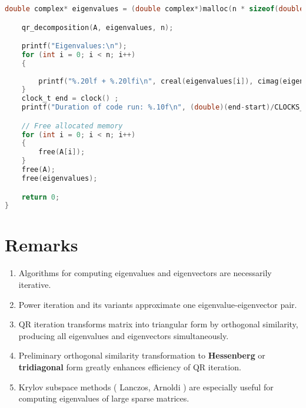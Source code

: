 \documentclass[report,12pt,onecolumn]{IEEEtran}
\theoremstyle{remark}
\begin{document}
\begin{itemize}
\begin{itemize}
\begin{lstlisting}[language = C]
    double complex* eigenvalues = (double complex*)malloc(n * sizeof(double complex));

    qr_decomposition(A, eigenvalues, n);

    printf("Eigenvalues:\n");
    for (int i = 0; i < n; i++) 
    {
        
        printf("%.20lf + %.20lfi\n", creal(eigenvalues[i]), cimag(eigenvalues[i]));
    }
    clock_t end = clock() ;
    printf("Duration of code run: %.10f\n", (double)(end-start)/CLOCKS_PER_SEC ) ;

    // Free allocated memory
    for (int i = 0; i < n; i++) 
    {
        free(A[i]);
    }
    free(A);
    free(eigenvalues);

    return 0;
}

					\end{lstlisting}
			\end{itemize}
	\end{itemize}
	\setcounter{section}{4}
	\section{\Large Remarks} 
		\begin{enumerate}
			\item Algorithms for computing eigenvalues and eigenvectors are necessarily iterative.
			\item Power iteration and its variants approximate one eigenvalue-eigenvector pair.
			\item QR iteration transforms matrix into triangular form by orthogonal similarity, producing all eigenvalues and eigenvectors simultaneously.
			\item Preliminary orthogonal similarity transformation to \textbf{Hessenberg} or \textbf{tridiagonal} form greatly enhances efficiency of QR iteration.
			\item Krylov subspace methods ( Lanczos, Arnoldi ) are especially useful for computing eigenvalues of large sparse matrices. 
		\end{enumerate}
\end{document}
